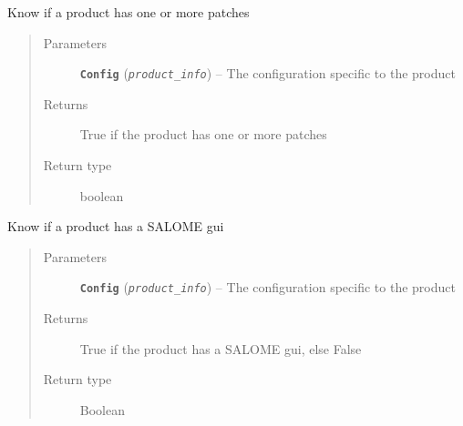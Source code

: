 \documentclass[a4paper,10pt,english]{sphinxmanual}
\begin{document}
\begin{fulllineitems}
\label{commands/apidoc/src:src.product.product_has_patches}
Know if a product has one or more patches
\begin{quote}\begin{description}
\item[{Parameters}] \leavevmode
\textbf{\texttt{Config}} (\emph{\texttt{product\_info}}) -- The configuration specific to 
the product

\item[{Returns}] \leavevmode
True if the product has one or more patches

\item[{Return type}] \leavevmode
boolean

\end{description}\end{quote}

\end{fulllineitems}


\begin{fulllineitems}
\label{commands/apidoc/src:src.product.product_has_salome_gui}
Know if a product has a SALOME gui
\begin{quote}\begin{description}
\item[{Parameters}] \leavevmode
\textbf{\texttt{Config}} (\emph{\texttt{product\_info}}) -- The configuration specific to 
the product

\item[{Returns}] \leavevmode
True if the product has a SALOME gui, else False

\item[{Return type}] \leavevmode
Boolean

\end{description}\end{quote}

\end{fulllineitems}

\end{document}
